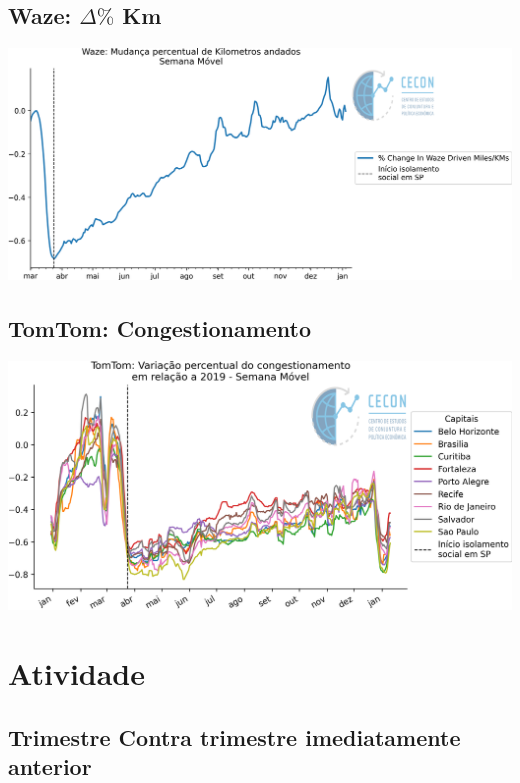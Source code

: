 \documentclass{SelfArx}
\begin{document}
\subsection*{Waze: \(\Delta \%\) Km}
\label{sec:orgde5ee75}

\begin{center}
\includegraphics[width=.9\linewidth]{./figs/Granulares/Waze_Brasil.png}
\end{center}

\subsection*{TomTom: Congestionamento}
\label{sec:org8c7b9ad}

\begin{center}
\includegraphics[width=.9\linewidth]{./figs/Granulares/TomTom_Brasil.png}
\end{center}

\section*{Atividade}
\label{sec:org618a0e1}



\subsection*{Trimestre Contra trimestre imediatamente anterior}
\label{sec:org477b545}
\end{document}
